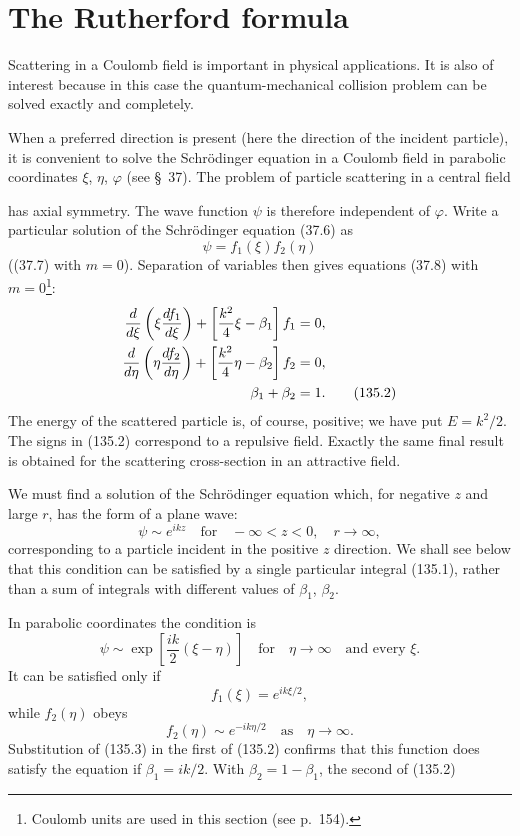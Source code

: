 \section{The Rutherford formula}

Scattering in a Coulomb field is important in physical applications. It is
also of interest because in this case the quantum-mechanical collision problem
can be solved exactly and completely.

When a preferred direction is present (here the direction of the incident
particle), it is convenient to solve the Schrödinger equation in a Coulomb
field in parabolic coordinates $\xi$, $\eta$, $\varphi$ (see \S~37). The
problem of particle scattering in a central field

has axial symmetry. The wave function $\psi$ is therefore independent of
$\varphi$. Write a particular solution of the Schrödinger equation (37.6) as
\begin{equation}
 \psi=f_1(\xi)f_2(\eta)
 \tag{135.1}
\end{equation}
((37.7) with $m=0$). Separation of variables then gives equations (37.8) with
$m=0$\footnote{Coulomb units are used in this section (see p.~154).}:
\begin{align}
 \frac{d}{d\xi}\left(\xi\frac{df_1}{d\xi}\right)
 +\left[\frac{k^2}{4}\xi-\beta_1\right]f_1&=0, \notag\\
 \frac{d}{d\eta}\left(\eta\frac{df_2}{d\eta}\right)
 +\left[\frac{k^2}{4}\eta-\beta_2\right]f_2&=0, \notag\\
 \beta_1+\beta_2&=1.
 \tag{135.2}
\end{align}
The energy of the scattered particle is, of course, positive; we have put
$E=k^2/2$. The signs in (135.2) correspond to a repulsive field. Exactly the
same final result is obtained for the scattering cross-section in an
attractive field.

We must find a solution of the Schrödinger equation which, for negative $z$
and large $r$, has the form of a plane wave:
\[
 \psi\sim e^{ikz}\quad\text{for}\quad-\infty<z<0,\quad r\to\infty,
\]
corresponding to a particle incident in the positive $z$ direction. We shall
see below that this condition can be satisfied by a single particular
integral (135.1), rather than a sum of integrals with different values of
$\beta_1$, $\beta_2$.

In parabolic coordinates the condition is
\[
 \psi\sim\exp\left[\frac{ik}{2}(\xi-\eta)\right]
 \quad\text{for}\quad\eta\to\infty\quad\text{and every }\xi.
\]
It can be satisfied only if
\begin{equation}
 f_1(\xi)=e^{ik\xi/2},
 \tag{135.3}
\end{equation}
while $f_2(\eta)$ obeys
\begin{equation}
 f_2(\eta)\sim e^{-ik\eta/2}\quad\text{as}\quad\eta\to\infty.
 \tag{135.4}
\end{equation}
Substitution of (135.3) in the first of (135.2) confirms that this function
does satisfy the equation if $\beta_1=ik/2$. With
$\beta_2=1-\beta_1$, the second of (135.2)


